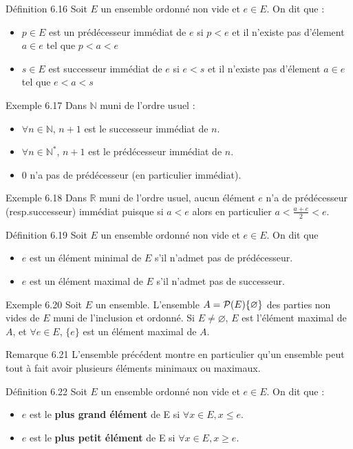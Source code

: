 \documentclass{article}
\begin{document}
\begin{adjustwidth}{-3cm}{-3cm}

Définition 6.16
Soit $E$ un ensemble ordonné non vide et $e \in E$. On dit que :
    \begin{itemize}
        \item $p \in E$ est un prédécesseur immédiat de $e$ si $p<e$ et il n'existe pas d'élement $a\in e$ tel que $p<a<e$
        \item $s \in E$ est successeur  immédiat de $e$ si $e<s$ et il n'existe pas d'élement $a\in e$ tel que $e<a<s$
    \end{itemize}
Exemple 6.17
Dans $\mathbb{N}$ muni de l'ordre usuel :
\begin{itemize}
    \item $\forall n \in \mathbb{N}$, $n+1$ est le successeur immédiat de $n$.
    \item $\forall n \in \mathbb{N}^*$, $n+1$ est le prédécesseur immédiat de $n$.
    \item $0$ n'a pas de prédécesseur (en particulier immédiat).
\end{itemize}

Exemple 6.18
Dans $\mathbb{R}$ muni de l'ordre usuel, aucun élément $e$ n'a de prédécesseur (resp.successeur) immédiat puisque si $a<e$ alors en particulier $a<\frac{a+e}{2}<e$.

Définition 6.19
Soit $E$ un ensemble ordonné non vide et $e \in E$. On dit que \begin{itemize}
    \item $e$ est un élément minimal de $E$ s'il n'admet pas de prédécesseur.
    \item $e$ est un élément maximal de $E$ s'il n'admet pas de successeur.
\end{itemize}

Exemple 6.20
Soit $E$ un ensemble. L'ensemble $A = \mathcal{P}(E)\\ \{\varnothing\}$ des parties non vides de $E$ muni de l'inclusion et ordonné. Si $E \neq \varnothing$, $E$ est l'élément maximal de $A$, et $\forall e \in E$, $\{e\}$ est un élément maximal de $A$.

Remarque 6.21
L'ensemble précédent montre en particulier qu'un ensemble peut tout à fait avoir plusieurs éléments minimaux ou maximaux.

Définition 6.22
Soit $E$ un ensemble ordonné non vide et $e\in E$. On dit que :
\begin{itemize}
    \item $e$ est le \textbf{plus grand élément} de E si $\forall x \in E, x \leq e$.
    \item $e$ est le \textbf{plus petit élément} de E si $\forall x \in E, x \geq e$.
\end{itemize}


\end{adjustwidth}
\end{document}
